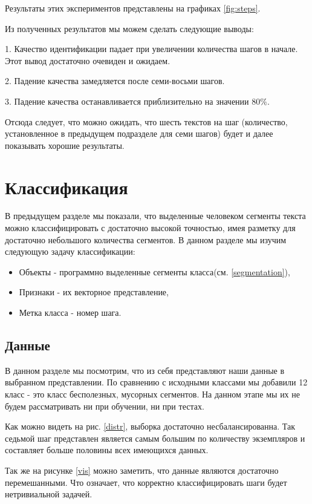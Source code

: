 \documentclass[12pt]{article}
\begin{document}
Результаты этих экспериментов представлены на графиках \ref{fig:steps}.

Из полученных результатов мы можем сделать следующие выводы:

1. Качество идентификации падает при увеличении количества шагов в начале. Этот вывод достаточно очевиден и ожидаем.

2. Падение качества замедляется после семи-восьми шагов.

3. Падение качества останавливается приблизительно на значении 80$\%$.

Отсюда следует, что можно ожидать, что шесть текстов на шаг (количество, установленное в предыдущем подразделе для семи шагов) будет и далее показывать хорошие результаты.

\section{Классификация}

В предыдущем разделе мы показали, что выделенные человеком сегменты текста можно классифицировать с достаточно высокой точностью, имея разметку для достаточно небольшого количества сегментов. В данном разделе мы изучим следующую задачу классификации:
\begin{itemize}
	\item Объекты - программно выделенные сегменты класса(см. \ref{segmentation}),
	\item Признаки - их векторное представление,
	\item Метка класса - номер шага.
\end{itemize}

\subsection{Данные}

В данном разделе мы посмотрим, что из себя представляют наши данные в выбранном представлении. По сравнению с исходными классами мы добавили 12 класс - это класс бесполезных, мусорных сегментов. На данном этапе мы их не будем рассматривать ни при обучении, ни при тестах.

Как можно видеть на рис. \ref{distr}, выборка достаточно несбалансированна. Так седьмой шаг представлен является самым большим по количеству экземпляров и составляет больше половины всех имеющихся данных.

Так же на рисунке \ref{vis} можно заметить, что данные являются достаточно перемешанными. Что означает, что корректно классифицировать шаги будет нетривиальной задачей.
\end{document}
